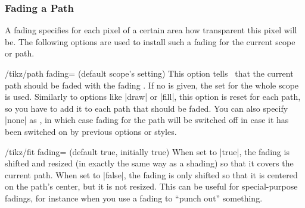 \subsubsection{Fading a Path}

A fading specifies for each pixel of a certain area how transparent this pixel
will be. The following options are used to install such a fading for the
current scope or path.


\begin{key}{/tikz/path fading= (default \normalfont scope's setting)}
    This option tells \tikzname\ that the current path should be faded with the
    fading . If no  is given, the  set for the
    whole scope is used. Similarly to options like |draw| or |fill|, this
    option is reset for each path, so you have to add it to each path that
    should be faded. You can also specify |none| as , in which case
    fading for the path will be switched off in case it has been switched on by
    previous options or styles.
\begin{codeexample}[preamble={\usetikzlibrary{fadings,patterns}},pre={\begin{lateximage}},post={\end{lateximage}},svg]
\end{codeexample}

    \begin{key}{/tikz/fit fading= (default true, initially true)}
        When set to |true|, the fading is shifted and resized (in exactly the
        same way as a shading) so that it covers the current path. When set to
        |false|, the fading is only shifted so that it is centered on the
        path's center, but it is not resized. This can be useful for
        special-purpose fadings, for instance when you use a fading to ``punch
        out'' something.
    \end{key}


\end{key}
